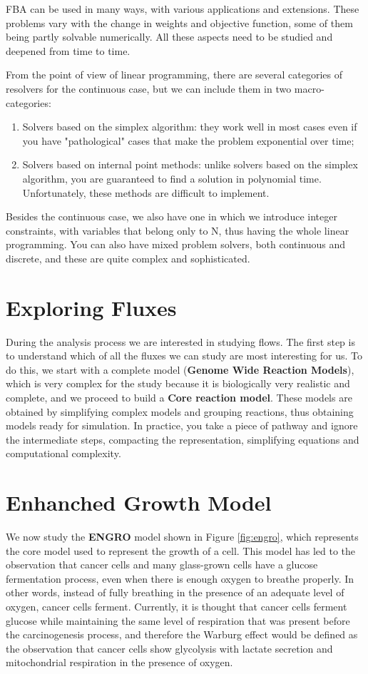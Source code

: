 FBA can be used in many ways, with various applications and extensions. These problems vary 
with the change in weights and objective function, some of them being partly solvable
numerically. All these aspects need to be studied and deepened from time to time.

From the point of view of linear programming, there are several categories of resolvers for 
the continuous case, but we can include them in two macro-categories:
\begin{enumerate}
    \item Solvers based on the simplex algorithm: they work well in most cases even if you 
        have "pathological" cases that make the problem exponential over time; 
    \item Solvers based on internal point methods: unlike solvers based on the simplex
        algorithm, you are guaranteed to find a solution in polynomial time. Unfortunately,
        these methods are difficult to implement.
\end{enumerate}
Besides the continuous case, we also have one in which we introduce integer constraints, 
with variables that belong only to N, thus having the whole linear programming. You can 
also have mixed problem solvers, both continuous and discrete, and these are quite complex 
and sophisticated.
\section{Exploring Fluxes}
During the analysis process we are interested in studying flows. The first step is to 
understand which of all the fluxes we can study are most interesting for us. To do this, 
we start with a complete model (\textbf{Genome Wide Reaction Models}), which is very complex
for the study because it is biologically very realistic and complete, and we proceed to build
a \textbf{Core reaction model}. These models are obtained by simplifying complex models and
grouping reactions, thus obtaining models ready for simulation. In practice, you take a
piece of pathway and ignore the intermediate steps, compacting the representation, simplifying
equations and computational complexity.
\section{Enhanched Growth Model}
We now study the \textbf{ENGRO} model shown in Figure \ref{fig:engro}, which represents the
core model used to represent the growth of a cell. This model has led to the observation that 
cancer cells and many glass-grown cells have a glucose fermentation process, even when there 
is enough oxygen to breathe properly. In other words, instead of fully breathing in the 
presence of an adequate level of oxygen, cancer cells ferment. Currently, it is thought that 
cancer cells ferment glucose while maintaining the same level of respiration that was present 
before the carcinogenesis process, and therefore the Warburg effect would be defined as the 
observation that cancer cells show glycolysis with lactate secretion and mitochondrial 
respiration in the presence of oxygen. 

